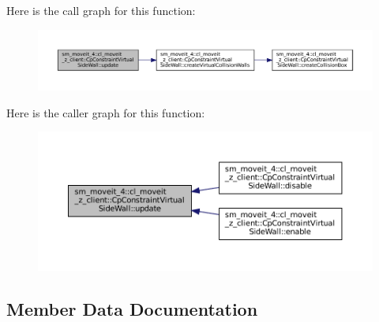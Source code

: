 Here is the call graph for this function\+:
\nopagebreak
\begin{figure}[H]
\begin{center}
\leavevmode
\includegraphics[width=350pt]{classsm__moveit__4_1_1cl__moveit__z__client_1_1CpConstraintVirtualSideWall_af0a5fbcc097cdbda75888b2b2a2e1f9e_cgraph}
\end{center}
\end{figure}
Here is the caller graph for this function\+:
\nopagebreak
\begin{figure}[H]
\begin{center}
\leavevmode
\includegraphics[width=350pt]{classsm__moveit__4_1_1cl__moveit__z__client_1_1CpConstraintVirtualSideWall_af0a5fbcc097cdbda75888b2b2a2e1f9e_icgraph}
\end{center}
\end{figure}


\subsection{Member Data Documentation}
\mbox{\label{classsm__moveit__4_1_1cl__moveit__z__client_1_1CpConstraintVirtualSideWall_a99dce43a47cbd8774e2f7deb1b3e1c47}} 
